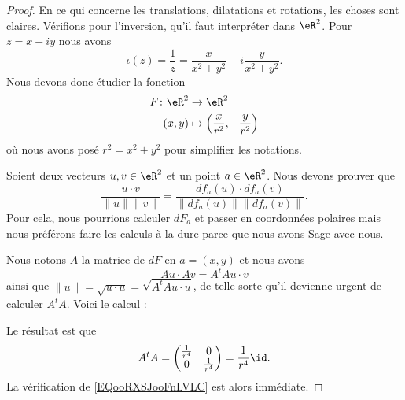 \begin{proof}
	En ce qui concerne les translations, dilatations et rotations, les choses sont claires. Vérifions pour l'inversion, qu'il faut interpréter dans \( \eR^2\). Pour \( z=x+iy\) nous avons
	\begin{equation}
		\iota(z)=\frac{1}{ z }=\frac{ x }{ x^2+y^2 }-i\frac{ y }{ x^2+y^2 }.
	\end{equation}
	Nous devons donc étudier la fonction
	\begin{equation}
		\begin{aligned}
			F\colon \eR^2 & \to \eR^2                                                   \\
			(x,y)         & \mapsto \left( \frac{ x }{ r^2 },-\frac{ y }{ r^2 } \right)
		\end{aligned}
	\end{equation}
	où nous avons posé \( r^2=x^2+y^2\) pour simplifier les notations.

	Soient deux vecteurs \( u,v\in \eR^2\) et un point \( a\in \eR^2\). Nous devons prouver que
	\begin{equation}        \label{EQooRXSJooFnLVLC}
		\frac{ u\cdot v }{ \| u \|\| v \| }=\frac{ df_a(u)\cdot df_a(v)  }{ \| df_a(u) \|\| df_a(v) \| }.
	\end{equation}
	Pour cela, nous pourrions calculer \( dF_a\) et passer en coordonnées polaires\cite{ooDTHEooBAnkGP} mais nous préférons faire les calculs à la dure parce que nous avons Sage avec nous.

	Nous notons \( A\) la matrice de \( dF\) en \( a=(x,y)\) et nous avons
	\begin{equation}
		Au\cdot Av=A^tAu\cdot v
	\end{equation}
	ainsi que \( \| u \|=\sqrt{ u\cdot u }=\sqrt{ A^tAu\cdot u }\), de telle sorte qu'il devienne urgent de calculer \( A^tA\). Voici le calcul :

	

	Le résultat est que
	\begin{equation}
		A^tA=\begin{pmatrix}
			\frac{1}{ r^4 } & 0               \\
			0               & \frac{1}{ r^4 }
		\end{pmatrix}=\frac{1}{ r^4 }\id.
	\end{equation}
	La vérification de \eqref{EQooRXSJooFnLVLC} est alors immédiate.
\end{proof}

